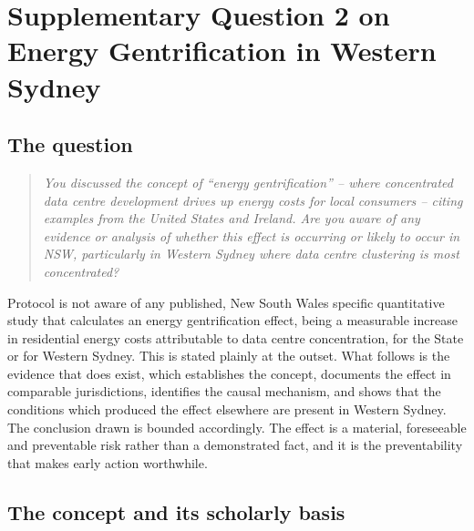 \chapter{Supplementary Question 2 on Energy Gentrification in Western Sydney}
\label{ch:supp:gentrification}

\section{The question}
\label{sec:supp:gen:q}

\begin{quote}
\itshape
You discussed the concept of ``energy gentrification'' -- where concentrated data centre development drives up energy costs for local consumers -- citing examples from the United States and Ireland. Are you aware of any evidence or analysis of whether this effect is occurring or likely to occur in NSW, particularly in Western Sydney where data centre clustering is most concentrated?
\end{quote}

Protocol is not aware of any published, New South Wales specific quantitative study that calculates an energy gentrification effect, being a measurable increase in residential energy costs attributable to data centre concentration, for the State or for Western Sydney. This is stated plainly at the outset. What follows is the evidence that does exist, which establishes the concept, documents the effect in comparable jurisdictions, identifies the causal mechanism, and shows that the conditions which produced the effect elsewhere are present in Western Sydney. The conclusion drawn is bounded accordingly. The effect is a material, foreseeable and preventable risk rather than a demonstrated fact, and it is the preventability that makes early action worthwhile.

\section{The concept and its scholarly basis}
\label{sec:supp:gen:concept}

